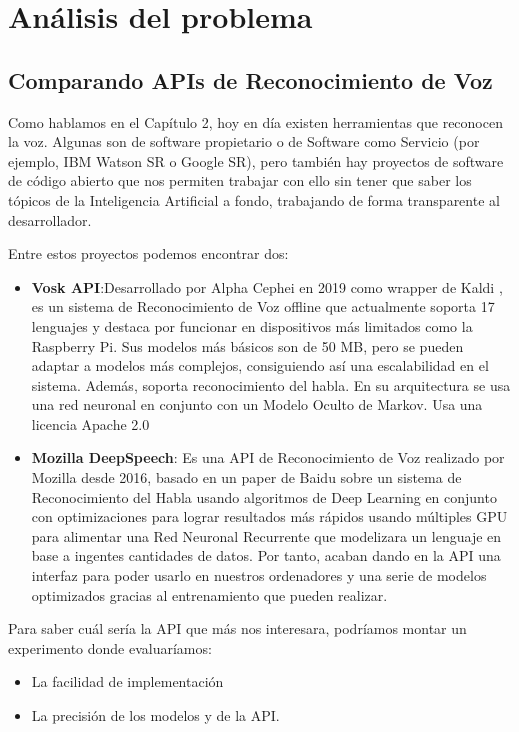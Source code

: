 \chapter{Análisis del problema}

\noindent{}

\section{Comparando APIs de Reconocimiento de Voz}
Como hablamos en el Capítulo 2, hoy en día existen herramientas que reconocen la voz. Algunas son de software propietario o de Software como Servicio (por ejemplo, IBM Watson SR o Google SR), pero también hay proyectos de software de código abierto que nos permiten trabajar con ello sin tener que saber los tópicos de la Inteligencia Artificial a fondo, trabajando de forma transparente al desarrollador. 

Entre estos proyectos podemos encontrar dos:
\begin{itemize}
	\item \textbf{Vosk API}:Desarrollado por Alpha Cephei en 2019 como wrapper de Kaldi , es un sistema de Reconocimiento de Voz offline que actualmente soporta 17 lenguajes y destaca por funcionar en dispositivos más limitados como la Raspberry Pi. Sus modelos más básicos son de 50 MB, pero se pueden adaptar a modelos más complejos, consiguiendo así una escalabilidad en el sistema. Además, soporta reconocimiento del habla. En su arquitectura se usa una red neuronal en conjunto con un Modelo Oculto de Markov. Usa una licencia Apache 2.0
	
	\item \textbf{Mozilla DeepSpeech}: Es una API de Reconocimiento de Voz realizado por Mozilla desde 2016, basado en un paper de Baidu sobre un sistema de Reconocimiento del Habla usando algoritmos de Deep Learning en conjunto con optimizaciones para lograr resultados más rápidos usando múltiples GPU para alimentar una Red Neuronal Recurrente que modelizara un lenguaje en base a ingentes cantidades de datos. Por tanto, acaban dando en la API una interfaz para poder usarlo en nuestros ordenadores y una serie de modelos optimizados gracias al entrenamiento que pueden realizar.
	
\end{itemize}

Para saber cuál sería la API que más nos interesara, podríamos montar un experimento donde evaluaríamos:
\begin{itemize}
	\item La facilidad de implementación
	\item La precisión de los modelos y de la API.
\end{itemize}

